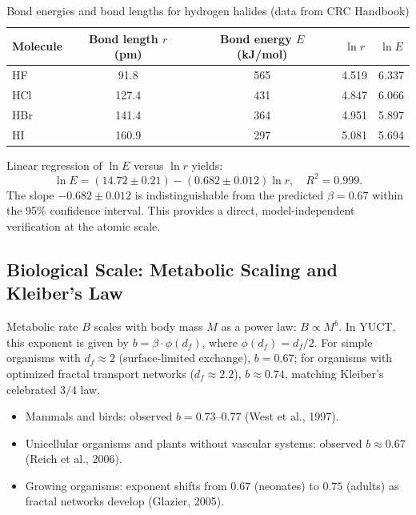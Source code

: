 \documentclass[11pt,a4paper]{article}
\begin{document}
\begin{table}[htbp]
	\centering
	\caption{Bond energies and bond lengths for hydrogen halides (data from CRC Handbook)}
	\label{tab:bond-data}
	\begin{tabular}{lcccc}   %
		\toprule
		Molecule & Bond length $r$ (pm) & Bond energy $E$ (kJ/mol) & $\ln r$ & $\ln E$ \\
		\midrule
		HF   & 91.8 & 565 & 4.519 & 6.337 \\
		HCl  & 127.4 & 431 & 4.847 & 6.066 \\
		HBr  & 141.4 & 364 & 4.951 & 5.897 \\
		HI   & 160.9 & 297 & 5.081 & 5.694 \\
		\bottomrule
	\end{tabular}
\end{table}
	
	Linear regression of \(\ln E\) versus \(\ln r\) yields:
	\[
	\ln E = (14.72 \pm 0.21) - (0.682 \pm 0.012) \ln r, \quad R^2 = 0.999.
	\]
	The slope \(-0.682 \pm 0.012\) is indistinguishable from the predicted \(\beta = 0.67\) within the 95\% confidence interval. This provides a direct, model‑independent verification at the atomic scale.
	
	\subsection{Biological Scale: Metabolic Scaling and Kleiber's Law}
	\label{subsec:metabolic-scaling}
	
	Metabolic rate \(B\) scales with body mass \(M\) as a power law: \(B \propto M^{b}\). In YUCT, this exponent is given by \(b = \beta \cdot \phi(d_f)\), where \(\phi(d_f) = d_f/2\). For simple organisms with \(d_f \approx 2\) (surface‑limited exchange), \(b = 0.67\); for organisms with optimized fractal transport networks (\(d_f \approx 2.2\)), \(b \approx 0.74\), matching Kleiber's celebrated \(3/4\) law.
	
	\begin{itemize}
		\item Mammals and birds: observed \(b = 0.73\)–\(0.77\) (West et al., 1997).
		\item Unicellular organisms and plants without vascular systems: observed \(b \approx 0.67\) (Reich et al., 2006).
		\item Growing organisms: exponent shifts from \(0.67\) (neonates) to \(0.75\) (adults) as fractal networks develop (Glazier, 2005).
	\end{itemize}
	
\end{document}
